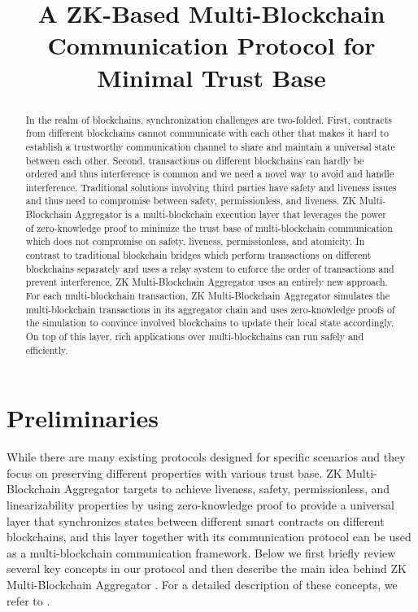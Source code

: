 \documentclass[pageno]{jpaper}
\begin{document}
\title{A ZK-Based Multi-Blockchain Communication Protocol for Minimal Trust Base}
\newcommand{\dprotocol}{ZK Multi-Blockchain Aggregator }
\date{}
\maketitle
\thispagestyle{empty}
\begin{abstract}
In the realm of blockchains, synchronization challenges are two-folded. First, contracts from different blockchains cannot communicate with each other that makes it hard to establish a trustworthy communication channel to share and maintain a universal state between each other. Second, transactions on different blockchains can hardly be ordered and thus interference is common and we need a novel way to avoid and handle interference. Traditional solutions involving third parties have safety and liveness issues and thus need to compromise between safety, permissionless, and liveness.  \dprotocol is a multi-blockchain execution layer that leverages the power of zero-knowledge proof to minimize the trust base of multi-blockchain communication which does not compromise on safety, liveness, permissionless, and atomicity. In contrast to traditional blockchain bridges which perform transactions on different blockchains separately and uses a relay system to enforce the order of transactions and prevent interference, \dprotocol uses an entirely new approach. For each multi-blockchain transaction, \dprotocol simulates the multi-blockchain transactions in its aggregator chain and uses zero-knowledge proofs of the simulation to convince involved blockchains to update their local state accordingly.  On top of this layer, rich applications over multi-blockchains can run safely and efficiently.
\end{abstract}


\section{Preliminaries}
\label{prelimiary}
While there are many existing protocols designed for specific scenarios and they focus on preserving different properties with various trust base. \dprotocol targets to achieve liveness, safety, permissionless, and linearizability properties by using zero-knowledge proof to provide a universal layer that synchronizes states between different smart contracts on different blockchains, and this layer together with its communication protocol can be used as a multi-blockchain communication framework. Below we first briefly review several key concepts in our protocol and then describe the main idea behind \dprotocol. For a detailed description of these concepts, we refer to \cite{robinson2021survey}. 
\end{document}

